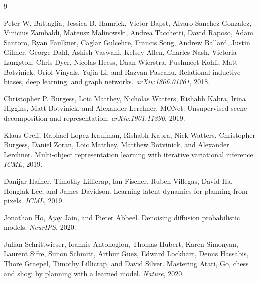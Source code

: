 \documentclass[10pt]{article}
\begin{document}
\begin{thebibliography}{9}

Peter W. Battaglia, Jessica B. Hamrick, Victor Bapst, Alvaro Sanchez-Gonzalez, Vinicius Zambaldi, Mateusz Malinowski, Andrea Tacchetti, David Raposo, Adam Santoro, Ryan Faulkner, Caglar Gulcehre, Francis Song, Andrew Ballard, Justin Gilmer, George Dahl, Ashish Vaswani, Kelsey Allen, Charles Nash, Victoria Langston, Chris Dyer, Nicolas Heess, Daan Wierstra, Pushmeet Kohli, Matt Botvinick, Oriol Vinyals, Yujia Li, and Razvan Pascanu.
\newblock Relational inductive biases, deep learning, and graph networks.
\newblock \emph{arXiv:1806.01261}, 2018.

Christopher P. Burgess, Loic Matthey, Nicholas Watters, Rishabh Kabra, Irina Higgins, Matt Botvinick, and Alexander Lerchner.
\newblock MONet: Unsupervised scene decomposition and representation.
\newblock \emph{arXiv:1901.11390}, 2019.

Klaus Greff, Raphael Lopez Kaufman, Rishabh Kabra, Nick Watters, Christopher Burgess, Daniel Zoran, Loic Matthey, Matthew Botvinick, and Alexander Lerchner.
\newblock Multi-object representation learning with iterative variational inference.
\newblock \emph{ICML}, 2019.

Danijar Hafner, Timothy Lillicrap, Ian Fischer, Ruben Villegas, David Ha, Honglak Lee, and James Davidson.
\newblock Learning latent dynamics for planning from pixels.
\newblock \emph{ICML}, 2019.

Jonathan Ho, Ajay Jain, and Pieter Abbeel.
\newblock Denoising diffusion probabilistic models.
\newblock \emph{NeurIPS}, 2020.

Julian Schrittwieser, Ioannis Antonoglou, Thomas Hubert, Karen Simonyan, Laurent Sifre, Simon Schmitt, Arthur Guez, Edward Lockhart, Demis Hassabis, Thore Graepel, Timothy Lillicrap, and David Silver.
\newblock Mastering Atari, Go, chess and shogi by planning with a learned model.
\newblock \emph{Nature}, 2020.

\end{thebibliography}
\end{document}
